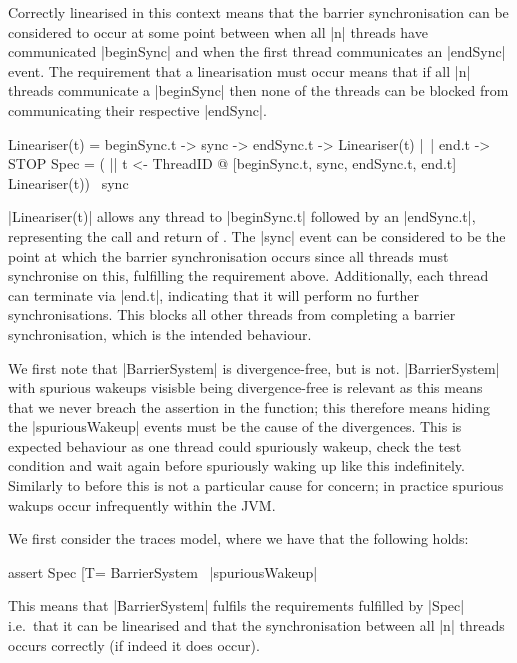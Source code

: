 Correctly linearised in this context means that the barrier synchronisation can be considered to occur at some point between when all |n| threads have communicated |beginSync| and when the first thread communicates an |endSync| event. The requirement that a linearisation must occur means that if all |n| threads communicate a |beginSync| then none of the threads can be blocked from communicating their respective |endSync|.

\begin{cspm}
  Lineariser(t) = beginSync.t -> sync -> endSync.t -> Lineariser(t)
                |~| end.t -> STOP
  Spec = ( || t <- ThreadID @ [{beginSync.t, sync, endSync.t, end.t}] 
               Lineariser(t)) \ {sync}
\end{cspm}

|Lineariser(t)| allows any thread to |beginSync.t| followed by an |endSync.t|, representing the call and return of . The |sync| event can be considered to be the point at which the barrier synchronisation occurs since all threads must synchronise on this, fulfilling the requirement above. Additionally, each thread can terminate via |end.t|, indicating that it will perform no further synchronisations. This blocks all other threads from completing a barrier synchronisation, which is the intended behaviour.

We first note that |BarrierSystem| is divergence-free, but  is not. |BarrierSystem| with spurious wakeups visisble being divergence-free is relevant as this means that we never breach the assertion in the  function; this therefore means hiding the |spuriousWakeup| events must be the cause of the divergences. This is expected behaviour as one thread could spuriously wakeup, check the test condition and wait again before spuriously waking up like this indefinitely. Similarly to before this is not a particular cause for concern; in practice spurious wakups occur infrequently within the JVM.

We first consider the traces model, where we have that the following holds:
\begin{cspm}
  assert Spec [T= BarrierSystem \ {|spuriousWakeup|}
\end{cspm}
This means that |BarrierSystem| fulfils the requirements fulfilled by |Spec| i.e.~that it can be linearised and that the synchronisation between all |n| threads occurs correctly (if indeed it does occur).

